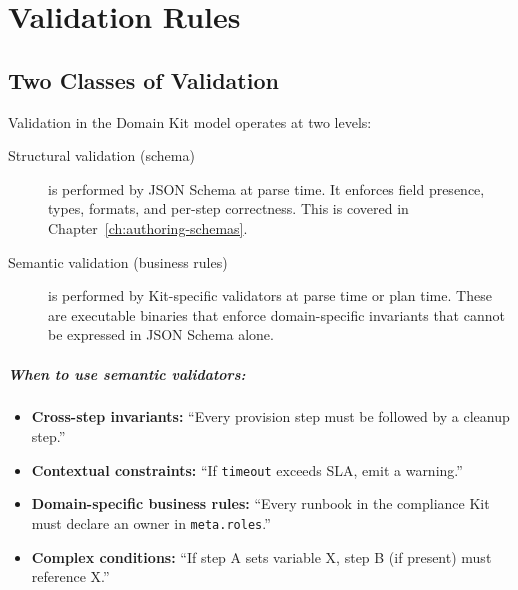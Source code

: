 
\chapter{Validation Rules}
\label{ch:validation-rules}

\section{Two Classes of Validation}
\label{sec:validation-classes}

Validation in the Domain Kit model operates at two levels:

\begin{description}
  \item[Structural validation (schema)] is performed by JSON Schema at parse
    time. It enforces field presence, types, formats, and per-step correctness.
    This is covered in Chapter~\ref{ch:authoring-schemas}.

  \item[Semantic validation (business rules)] is performed by Kit-specific
    validators at parse time or plan time. These are executable binaries that
    enforce domain-specific invariants that cannot be expressed in JSON Schema
    alone.
\end{description}

\paragraph{When to use semantic validators:}

\begin{itemize}
  \item \textbf{Cross-step invariants:} ``Every provision step must be followed
    by a cleanup step.''
  \item \textbf{Contextual constraints:} ``If \texttt{timeout} exceeds SLA,
    emit a warning.''
  \item \textbf{Domain-specific business rules:} ``Every runbook in the
    compliance Kit must declare an owner in \texttt{meta.roles}.''
  \item \textbf{Complex conditions:} ``If step A sets variable X, step B (if
    present) must reference X.''
\end{itemize}


